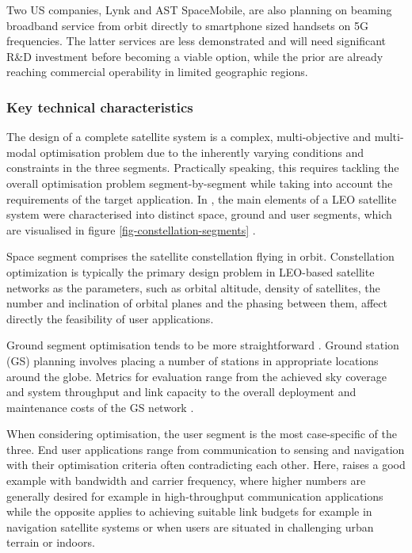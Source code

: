 \documentclass[english, 12pt, a4paper, elec, utf8, a-1b, online]{aaltothesis}
\begin{document}
Two US companies, Lynk and AST SpaceMobile, are also planning on beaming broadband service from orbit directly to smartphone sized handsets on 5G frequencies.
The latter services are less demonstrated and will need significant R\&D investment before becoming a viable option, while the prior are already reaching commercial operability in limited geographic regions.

\subsubsection{Key technical characteristics} \label{ch-constellation-characteristics}
The design of a complete satellite system is a complex, multi-objective and multi-modal optimisation problem due to the inherently varying conditions and constraints in the three segments.
Practically speaking, this requires tackling the overall optimisation problem segment-by-segment while taking into account the requirements of the target application.
In , the main elements of a LEO satellite system were characterised into distinct space, ground and user segments, which are visualised in figure \ref{fig-constellation-segments} \cite{celikbilek2022survey}.

Space segment comprises the satellite constellation flying in orbit.
Constellation optimization is typically the primary design problem in LEO-based satellite networks as the parameters, such as orbital altitude, density of satellites, the number and inclination of orbital planes and the phasing between them, affect directly the feasibility of user applications.%

Ground segment optimisation tends to be more straightforward .
Ground station (GS) planning involves placing a number of stations in appropriate locations around the globe.
Metrics for evaluation range from the achieved sky coverage and system throughput and link capacity to the overall deployment and maintenance costs of the GS network \cite{celikbilek2022survey}.

When considering optimisation, the user segment is the most case-specific of the three.
End user applications range from communication to sensing and navigation with their optimisation criteria often contradicting each other.
Here, \cite{celikbilek2022survey} raises a good example with bandwidth and carrier frequency, where higher numbers are generally desired for example in high-throughput communication applications while the opposite applies to achieving suitable link budgets for example in navigation satellite systems or when users are situated in challenging urban terrain or indoors.
\end{document}
